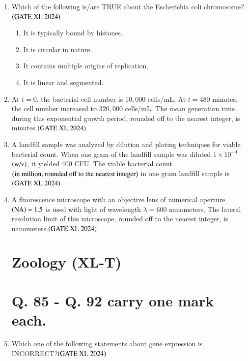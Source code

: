 \documentclass[journal]{IEEEtran}
\begin{document}
\begin{enumerate}
    \item Which of the following is/are TRUE about the Escherichia coli chromosome?\hfill $\left(\text{GATE XL 2024}\right)$
    \begin{enumerate}
        \item It is typically bound by histones.
        \item It is circular in nature.
        \item It contains multiple origins of replication.
        \item It is linear and segmented.
    \end{enumerate}

    \item At $t = 0$, the bacterial cell number is $10{,}000$ cells/mL. At $t = 480$ minutes, the cell number increased to $320{,}000$ cells/mL. The mean generation time during this exponential growth period, rounded off to the nearest integer, is minutes.\hfill $\left(\text{GATE XL 2024}\right)$

    \item A landfill sample was analyzed by dilution and plating techniques for viable bacterial count. When one gram of the landfill sample was diluted $1 \times 10^{-4}$ $\left(\text{w/v}\right)$, it yielded $400$ CFU. The viable bacterial count $\left(\text{in million, rounded off to the nearest integer}\right)$ in one gram landfill sample is\hfill $\left(\text{GATE XL 2024}\right)$

    \item A fluorescence microscope with an objective lens of numerical aperture $\left(\text{NA}\right) = 1.5$ is used with light of wavelength $\lambda = 600$ nanometers. The lateral resolution limit of this microscope, rounded off to the nearest integer, is nanometers.\hfill $\left(\text{GATE XL 2024}\right)$

\maketitle
\section*{Zoology (XL-T)}
\section*{Q. 85 - Q. 92 carry one mark each.} 
\setcounter{enumi}{84}
    \item Which one of the following statements about gene expression is INCORRECT?\hfill $\left(\text{GATE XL 2024}\right)$
    \begin{enumerate}
    \end{enumerate}


\end{enumerate}
\end{document}
